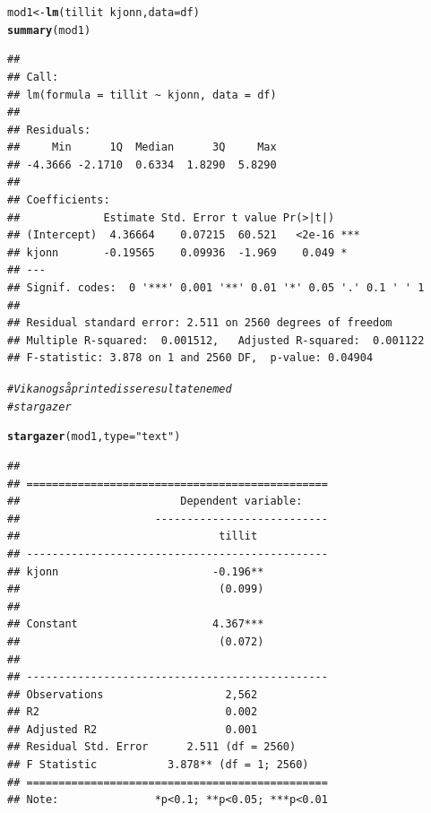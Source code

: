 \documentclass{article}\usepackage[]{graphicx}\usepackage[]{color}
\makeatletter
\newcommand{\hlstr}[1]{\textcolor[rgb]{0.192,0.494,0.8}{#1}}%
\newcommand{\hlcom}[1]{\textcolor[rgb]{0.678,0.584,0.686}{\textit{#1}}}%
\newcommand{\hlopt}[1]{\textcolor[rgb]{0,0,0}{#1}}%
\newcommand{\hlstd}[1]{\textcolor[rgb]{0.345,0.345,0.345}{#1}}%
\newcommand{\hlkwb}[1]{\textcolor[rgb]{0.69,0.353,0.396}{#1}}%
\newcommand{\hlkwc}[1]{\textcolor[rgb]{0.333,0.667,0.333}{#1}}%
\newcommand{\hlkwd}[1]{\textcolor[rgb]{0.737,0.353,0.396}{\textbf{#1}}}%
\newenvironment{kframe}{%
 \def\at@end@of@kframe{}%
 \ifinner\ifhmode%
  \def\at@end@of@kframe{\end{minipage}}%
  \begin{minipage}{\columnwidth}%
 \fi\fi%
 \def\FrameCommand##1{\hskip\@totalleftmargin \hskip-\fboxsep
 \colorbox{shadecolor}{##1}\hskip-\fboxsep
     \hskip-\linewidth \hskip-\@totalleftmargin \hskip\columnwidth}%
 \MakeFramed {\advance\hsize-\width
   \@totalleftmargin\z@ \linewidth\hsize
   \@setminipage}}%
 {\par\unskip\endMakeFramed%
 \at@end@of@kframe}
\newenvironment{knitrout}{}{} %
\makeatother
\begin{document}
\begin{knitrout}
\color{fgcolor}\begin{kframe}
\begin{alltt}
\hlstd{mod1} \hlkwb{<-} \hlkwd{lm}\hlstd{(tillit} \hlopt{~} \hlstd{kjonn,} \hlkwc{data} \hlstd{= df)}
\hlkwd{summary}\hlstd{(mod1)}
\end{alltt}
\begin{verbatim}
## 
## Call:
## lm(formula = tillit ~ kjonn, data = df)
## 
## Residuals:
##     Min      1Q  Median      3Q     Max 
## -4.3666 -2.1710  0.6334  1.8290  5.8290 
## 
## Coefficients:
##             Estimate Std. Error t value Pr(>|t|)    
## (Intercept)  4.36664    0.07215  60.521   <2e-16 ***
## kjonn       -0.19565    0.09936  -1.969    0.049 *  
## ---
## Signif. codes:  0 '***' 0.001 '**' 0.01 '*' 0.05 '.' 0.1 ' ' 1
## 
## Residual standard error: 2.511 on 2560 degrees of freedom
## Multiple R-squared:  0.001512,	Adjusted R-squared:  0.001122 
## F-statistic: 3.878 on 1 and 2560 DF,  p-value: 0.04904
\end{verbatim}
\begin{alltt}
\hlcom{# Vi kan også printe disse resultatene med }
\hlcom{# stargazer }

\hlkwd{stargazer}\hlstd{(mod1,} \hlkwc{type} \hlstd{=} \hlstr{"text"}\hlstd{)}
\end{alltt}
\begin{verbatim}
## 
## ===============================================
##                         Dependent variable:    
##                     ---------------------------
##                               tillit           
## -----------------------------------------------
## kjonn                        -0.196**          
##                               (0.099)          
##                                                
## Constant                     4.367***          
##                               (0.072)          
##                                                
## -----------------------------------------------
## Observations                   2,562           
## R2                             0.002           
## Adjusted R2                    0.001           
## Residual Std. Error      2.511 (df = 2560)     
## F Statistic           3.878** (df = 1; 2560)   
## ===============================================
## Note:               *p<0.1; **p<0.05; ***p<0.01
\end{verbatim}
\end{kframe}
\end{knitrout}
\end{document}
